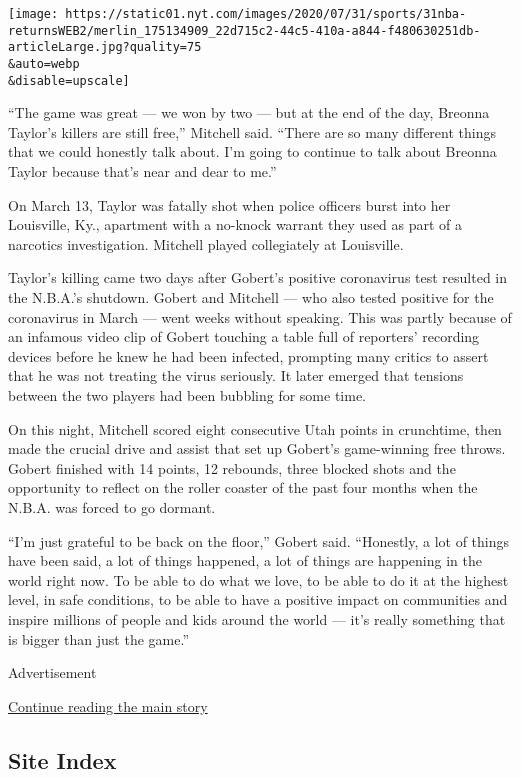 \texttt{[image: https://static01.nyt.com/images/2020/07/31/sports/31nba-returnsWEB2/merlin\_175134909\_22d715c2-44c5-410a-a844-f480630251db-articleLarge.jpg?quality=75\\\&auto=webp\\\&disable=upscale]}

``The game was great --- we won by two --- but at the end of the day,
Breonna Taylor's killers are still free,'' Mitchell said. ``There are so
many different things that we could honestly talk about. I'm going to
continue to talk about Breonna Taylor because that's near and dear to
me.''

On March 13, Taylor was fatally shot when police officers burst into her
Louisville, Ky., apartment with a no-knock warrant they used as part of
a narcotics investigation. Mitchell played collegiately at Louisville.

Taylor's killing came two days after Gobert's positive coronavirus test
resulted in the N.B.A.'s shutdown. Gobert and Mitchell --- who also
tested positive for the coronavirus in March --- went weeks without
speaking. This was partly because of an infamous video clip of Gobert
touching a table full of reporters' recording devices before he knew he
had been infected, prompting many critics to assert that he was not
treating the virus seriously. It later emerged that tensions between the
two players had been bubbling for some time.

On this night, Mitchell scored eight consecutive Utah points in
crunchtime, then made the crucial drive and assist that set up Gobert's
game-winning free throws. Gobert finished with 14 points, 12 rebounds,
three blocked shots and the opportunity to reflect on the roller coaster
of the past four months when the N.B.A. was forced to go dormant.

``I'm just grateful to be back on the floor,'' Gobert said. ``Honestly,
a lot of things have been said, a lot of things happened, a lot of
things are happening in the world right now. To be able to do what we
love, to be able to do it at the highest level, in safe conditions, to
be able to have a positive impact on communities and inspire millions of
people and kids around the world --- it's really something that is
bigger than just the game.''

Advertisement

\protect\hyperlink{after-bottom}{Continue reading the main story}

\hypertarget{site-index}{%
\subsection{Site Index}\label{site-index}}

